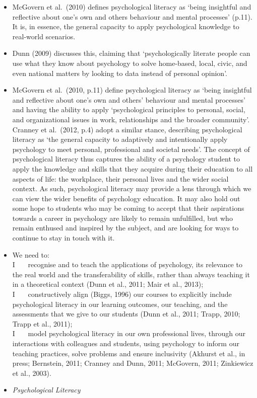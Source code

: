 \documentclass[
  11pt,
  letterpaper,
  oneside,
  open=any]{scrbook}
\begin{document}
\begin{itemize}
\begin{tcolorbox}
  \begin{itemize}
  \item
    McGovern et al.~(2010) defines psychological literacy as `being
    insightful and reflective about one's own and others behaviour and
    mental processes' (p.11). It is, in essence, the general capacity to
    apply psychological knowledge to real-world scenarios.
  \item
    Dunn (2009) discusses this, claiming that `psychologically literate
    people can use what they know about psychology to solve home-based,
    local, civic, and even national matters by looking to data instead
    of personal opinion'.
  \item
    McGovern et al.~(2010, p.11) define psychological literacy as `being
    insightful and reflective about one's own and others' behaviour and
    mental processes' and having the ability to apply `psychological
    principles to personal, social, and organizational issues in work,
    relationships and the broader community'. Cranney et al.~(2012, p.4)
    adopt a similar stance, describing psychological literacy as `the
    general capacity to adaptively and intentionally apply psychology to
    meet personal, professional and societal needs'. The concept of
    psychological literacy thus captures the ability of a psychology
    student to apply the knowledge and skills that they acquire during
    their education to all aspects of life: the workplace, their
    personal lives and the wider social context. As such, psychological
    literacy may provide a lens through which we can view the wider
    benefits of psychology education. It may also hold out some hope to
    students who may be coming to accept that their aspirations towards
    a career in psychology are likely to remain unfulfilled, but who
    remain enthused and inspired by the subject, and are looking for
    ways to continue to stay in touch with it.
  \item
    We need to:\\
    I~~ ~recognise and to teach the applications of psychology, its
    relevance to the real world and the transferability of skills,
    rather than always teaching it in a theoretical context (Dunn et
    al., 2011; Mair et al., 2013);\\
    I~~ ~constructively align (Biggs, 1996) our courses to explicitly
    include psychological literacy in our learning outcomes, our
    teaching, and the assessments that we give to our students (Dunn et
    al., 2011; Trapp, 2010; Trapp et al., 2011);\\
    I~~ ~model psychological literacy in our own professional lives,
    through our interactions with colleagues and students, using
    psychology to inform our teaching practices, solve problems and
    ensure inclusivity (Akhurst et al., in press; Bernstein, 2011;
    Cranney and Dunn, 2011; McGovern, 2011; Zinkiewicz et al., 2003).
  \item
    \emph{Psychological Literacy}


\end{itemize}
\end{tcolorbox}
\end{itemize}
\end{document}
